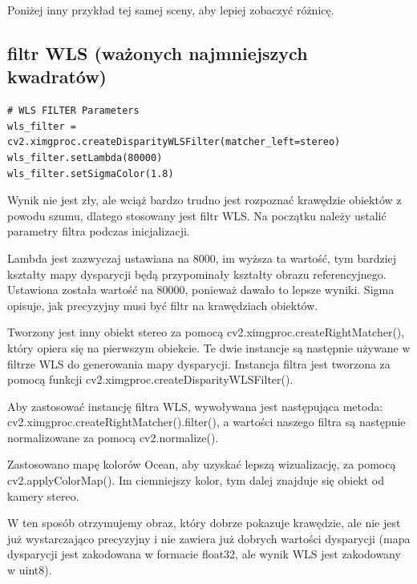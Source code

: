 \documentclass[magisterska]{pracadypl}
\begin{document}

Poniżej inny przykład tej samej sceny, aby lepiej zobaczyć różnicę.

\subsection{filtr WLS (ważonych najmniejszych kwadratów)}

\begin{lstlisting}[style=mypython]
# WLS FILTER Parameters
wls_filter = cv2.ximgproc.createDisparityWLSFilter(matcher_left=stereo)
wls_filter.setLambda(80000)
wls_filter.setSigmaColor(1.8)
\end{lstlisting}

Wynik nie jest zły, ale wciąż bardzo trudno jest rozpoznać krawędzie obiektów z powodu szumu, dlatego stosowany jest filtr WLS. Na początku należy ustalić parametry filtra podczas inicjalizacji.

Lambda jest zazwyczaj ustawiana na 8000, im wyższa ta wartość, tym bardziej kształty mapy dysparycji będą przypominały kształty obrazu referencyjnego. Ustawiona została wartość na 80000, ponieważ dawało to lepsze wyniki. Sigma opisuje, jak precyzyjny musi być filtr na krawędziach obiektów.

Tworzony jest inny obiekt stereo za pomocą cv2.ximgproc.createRightMatcher(), który opiera się na pierwszym obiekcie. Te dwie instancje są następnie używane w filtrze WLS do generowania mapy dysparycji. Instancja filtra jest tworzona za pomocą funkcji cv2.ximgproc.createDisparityWLSFilter().

Aby zastosować instancję filtra WLS, wywoływana jest następująca metoda: cv2.ximgproc.createRightMatcher().filter(), a wartości naszego filtra są następnie normalizowane za pomocą cv2.normalize().

Zastosowano mapę kolorów Ocean, aby uzyskać lepszą wizualizację, za pomocą cv2.applyColorMap(). Im ciemniejszy kolor, tym dalej znajduje się obiekt od kamery stereo.

W ten sposób otrzymujemy obraz, który dobrze pokazuje krawędzie, ale nie jest już wystarczająco precyzyjny i nie zawiera już dobrych wartości dysparycji (mapa dysparycji jest zakodowana w formacie float32, ale wynik WLS jest zakodowany w uint8).
\end{document}
